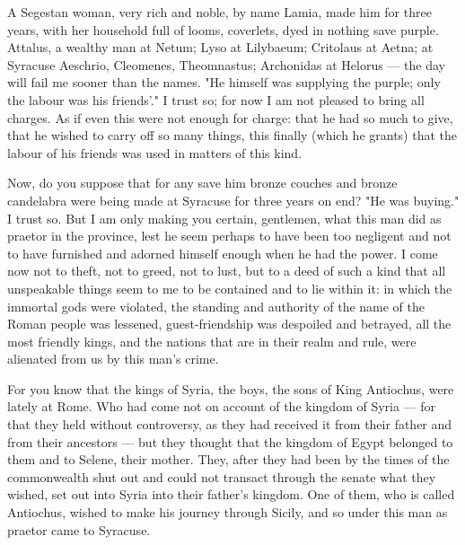  A Segestan woman, very rich and noble, by name Lamia, made him for three years, with her household full of looms, coverlets, dyed in nothing save purple. Attalus, a wealthy man at Netum; Lyso at Lilybaeum; Critolaus at Aetna; at Syracuse Aeschrio, Cleomenes, Theomnastus; Archonidas at Helorus --- the day will fail me sooner than the names. "He himself was supplying the purple; only the labour was his friends'." I trust so; for now I am not pleased to bring all charges. As if even this were not enough for charge: that he had so much to give, that he wished to carry off so many things, this finally (which he grants) that the labour of his friends was used in matters of this kind.

 Now, do you suppose that for any save him bronze couches and bronze candelabra were being made at Syracuse for three years on end? "He was buying." I trust so. But I am only making you certain, gentlemen, what this man did as praetor in the province, lest he seem perhaps to have been too negligent and not to have furnished and adorned himself enough when he had the power. I come now not to theft, not to greed, not to lust, but to a deed of such a kind that all unspeakable things seem to me to be contained and to lie within it: in which the immortal gods were violated, the standing and authority of the name of the Roman people was lessened, guest-friendship was despoiled and betrayed, all the most friendly kings, and the nations that are in their realm and rule, were alienated from us by this man's crime.

 For you know that the kings of Syria, the boys, the sons of King Antiochus, were lately at Rome. Who had come not on account of the kingdom of Syria --- for that they held without controversy, as they had received it from their father and from their ancestors --- but they thought that the kingdom of Egypt belonged to them and to Selene, their mother. They, after they had been by the times of the commonwealth shut out and could not transact through the senate what they wished, set out into Syria into their father's kingdom. One of them, who is called Antiochus, wished to make his journey through Sicily, and so under this man as praetor came to Syracuse.

